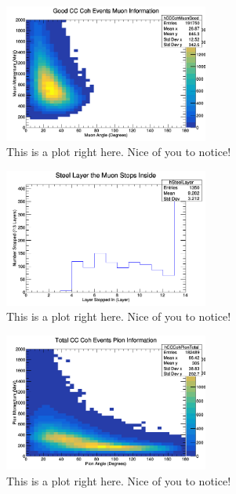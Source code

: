 \documentclass[11pt]{article}
\begin{document}
\begin{figure}[H]
\centering
\includegraphics[width=0.6\textwidth]{NewNMBergerSehgalImages/6-GoodCCCohMuonInfoNMBS.png}
\caption{This is a plot right here. Nice of you to notice!}
\end{figure}

\begin{figure}[H]
\centering
\includegraphics[width=0.6\textwidth]{NewNMBergerSehgalImages/7-LayerPenetrationNMBS.png}
\caption{This is a plot right here. Nice of you to notice!}
\end{figure}

\begin{figure}[H]
\centering
\includegraphics[width=0.6\textwidth]{NewNMBergerSehgalImages/8-TotalCCCohPionInfoNMBS.png}
\caption{This is a plot right here. Nice of you to notice!}
\end{figure}
\end{document}
